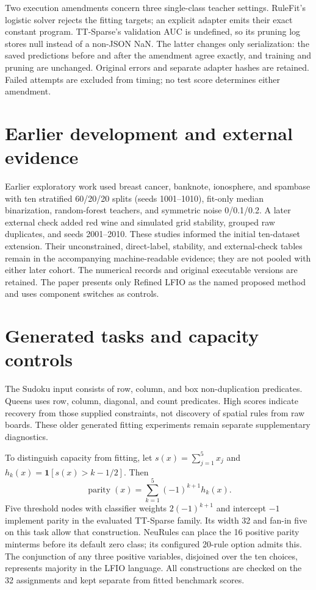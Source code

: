 \documentclass[a4paper,fleqn,review]{cas-sc}
\newcommand{\kbsbarrier}{\FloatBarrier}
\newcommand{\kbsbarrier}{}
\begin{document}
Two execution amendments concern three single-class teacher settings. RuleFit's logistic solver rejects the fitting targets; an explicit adapter emits their exact constant program. TT-Sparse's validation AUC is undefined, so its pruning log stores null instead of a non-JSON NaN. The latter changes only serialization: the saved predictions before and after the amendment agree exactly, and training and pruning are unchanged. Original errors and separate adapter hashes are retained. Failed attempts are excluded from timing; no test score determines either amendment.
\kbsbarrier

\section{Earlier development and external evidence}\label{app:development}
Earlier exploratory work used breast cancer, banknote, ionosphere, and spambase with ten stratified 60/20/20 splits (seeds 1001--1010), fit-only median binarization, random-forest teachers, and symmetric noise 0/0.1/0.2. A later external check added red wine and simulated grid stability, grouped raw duplicates, and seeds 2001--2010. These studies informed the initial ten-dataset extension. Their unconstrained, direct-label, stability, and external-check tables remain in the accompanying machine-readable evidence; they are not pooled with either later cohort. The numerical records and original executable versions are retained. The paper presents only Refined LFIO as the named proposed method and uses component switches as controls.
\kbsbarrier

\section{Generated tasks and capacity controls}\label{app:synthetic}
The Sudoku input consists of row, column, and box non-duplication predicates. Queens uses row, column, diagonal, and count predicates. High scores indicate recovery from those supplied constraints, not discovery of spatial rules from raw boards. These older generated fitting experiments remain separate supplementary diagnostics.

To distinguish capacity from fitting, let $s(x)=\sum_{j=1}^5x_j$ and $h_k(x)=\mathbf{1}[s(x)>k-1/2]$. Then
\begin{equation}
 \operatorname{parity}(x)=\sum_{k=1}^5(-1)^{k+1}h_k(x).
\end{equation}
Five threshold nodes with classifier weights $2(-1)^{k+1}$ and intercept $-1$ implement parity in the evaluated TT-Sparse family. Its width 32 and fan-in five on this task allow that construction. NeuRules can place the 16 positive parity minterms before its default zero class; its configured 20-rule option admits this. The conjunction of any three positive variables, disjoined over the ten choices, represents majority in the LFIO language. All constructions are checked on the 32 assignments and kept separate from fitted benchmark scores.
\end{document}
